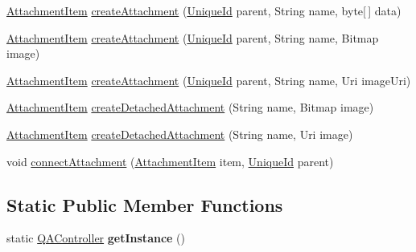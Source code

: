 \begin{DoxyCompactItemize}
\item 
\hyperlink{classcom_1_1ualberta_1_1team17_1_1_attachment_item}{Attachment\+Item} \hyperlink{classcom_1_1ualberta_1_1team17_1_1controller_1_1_q_a_controller_ac9c034b0b27dae371c9bfebb0cd61708}{create\+Attachment} (\hyperlink{classcom_1_1ualberta_1_1team17_1_1_unique_id}{Unique\+Id} parent, String name, byte\mbox{[}$\,$\mbox{]} data)
\item 
\hyperlink{classcom_1_1ualberta_1_1team17_1_1_attachment_item}{Attachment\+Item} \hyperlink{classcom_1_1ualberta_1_1team17_1_1controller_1_1_q_a_controller_a7a44973b43bfd9fcdc3f81825b727a9d}{create\+Attachment} (\hyperlink{classcom_1_1ualberta_1_1team17_1_1_unique_id}{Unique\+Id} parent, String name, Bitmap image)
\item 
\hyperlink{classcom_1_1ualberta_1_1team17_1_1_attachment_item}{Attachment\+Item} \hyperlink{classcom_1_1ualberta_1_1team17_1_1controller_1_1_q_a_controller_af6cad2a53d6097c43a35e5974fbb1ca6}{create\+Attachment} (\hyperlink{classcom_1_1ualberta_1_1team17_1_1_unique_id}{Unique\+Id} parent, String name, Uri image\+Uri)
\item 
\hyperlink{classcom_1_1ualberta_1_1team17_1_1_attachment_item}{Attachment\+Item} \hyperlink{classcom_1_1ualberta_1_1team17_1_1controller_1_1_q_a_controller_a6a91029b3fd2ae584e3dd87cd325fc0c}{create\+Detached\+Attachment} (String name, Bitmap image)
\item 
\hyperlink{classcom_1_1ualberta_1_1team17_1_1_attachment_item}{Attachment\+Item} \hyperlink{classcom_1_1ualberta_1_1team17_1_1controller_1_1_q_a_controller_afb53de811965811217c1c7c96609f610}{create\+Detached\+Attachment} (String name, Uri image)
\item 
void \hyperlink{classcom_1_1ualberta_1_1team17_1_1controller_1_1_q_a_controller_adc0e511dc666c0d874145251f5f5f4c7}{connect\+Attachment} (\hyperlink{classcom_1_1ualberta_1_1team17_1_1_attachment_item}{Attachment\+Item} item, \hyperlink{classcom_1_1ualberta_1_1team17_1_1_unique_id}{Unique\+Id} parent)
\end{DoxyCompactItemize}
\subsection*{Static Public Member Functions}
\begin{DoxyCompactItemize}
\item 
\hypertarget{classcom_1_1ualberta_1_1team17_1_1controller_1_1_q_a_controller_af0e7990c1448ffdc649a9dcd185d98ec}{static \hyperlink{classcom_1_1ualberta_1_1team17_1_1controller_1_1_q_a_controller}{Q\+A\+Controller} {\bfseries get\+Instance} ()}\label{classcom_1_1ualberta_1_1team17_1_1controller_1_1_q_a_controller_af0e7990c1448ffdc649a9dcd185d98ec}

\end{DoxyCompactItemize}


